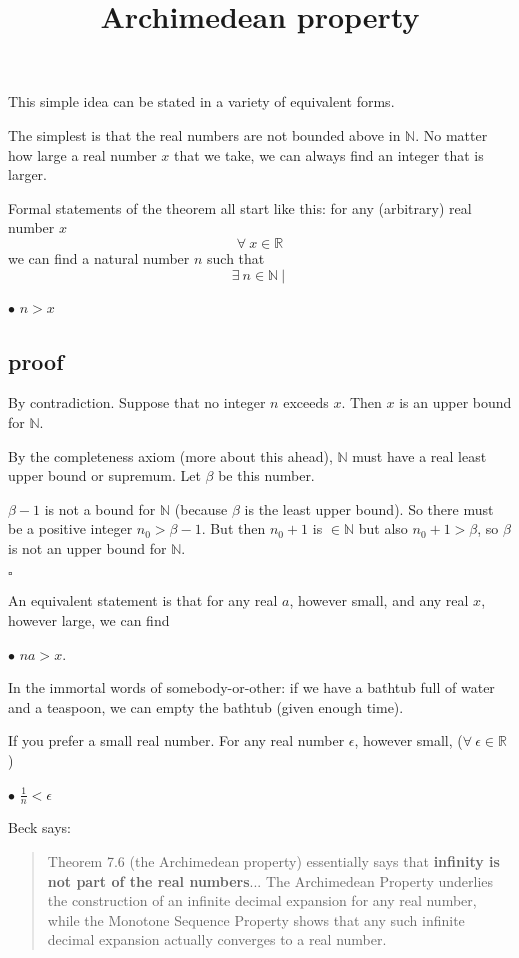 \documentclass[11pt, oneside]{article}
\title{Archimedean property}
\date{}
\begin{document}
\maketitle
\Large

This simple idea can be stated in a variety of equivalent forms.

The simplest is that the real numbers are not bounded above in $\mathbb{N}$.  No matter how large a real number $x$ that we take, we can always find an integer that is larger.

Formal statements of the theorem all start like this:  for any (arbitrary) real number $x$
\[ \forall \ x \in \mathbb{R} \]
we can find a natural number $n$ such that
\[ \exists \ n \in \mathbb{N} \ | \ \]

$\bullet$  $n > x$

\subsection*{proof}

By contradiction.  Suppose that no integer $n$ exceeds $x$.  Then $x$ is an upper bound for $\mathbb{N}$.

By the completeness axiom (more about this ahead), $\mathbb{N}$ must have a real least upper bound or supremum.  Let $\beta$ be this number.  

$\beta - 1$ is not a bound for $\mathbb{N}$ (because $\beta$ is the least upper bound).  So there must be a positive integer $n_0 > \beta - 1$.  But then $n_0 + 1$ is $\in \mathbb{N}$ but also $n_0 + 1 > \beta$, so $\beta$ is not an upper bound for $\mathbb{N}$.

$\square$

An equivalent statement is that for any real $a$, however small, and any real $x$, however large, we can find 

$\bullet$  $na > x$.

In the immortal words of somebody-or-other:  if we have a bathtub full of water and a teaspoon, we can empty the bathtub (given enough time).

If you prefer a small real number.  For any real number $\epsilon$, however small, ($\forall \ \epsilon \in \mathbb{R}$)

$\bullet$  $\frac{1}{n} < \epsilon$

Beck says:

\begin{quote}Theorem 7.6 (the Archimedean property) essentially says that \textbf{infinity is not part of the real numbers}... The Archimedean Property underlies the construction of an infinite decimal expansion for any real number, while the Monotone Sequence Property shows that any such infinite decimal expansion actually converges to a real number.\end{quote}
\end{document}
